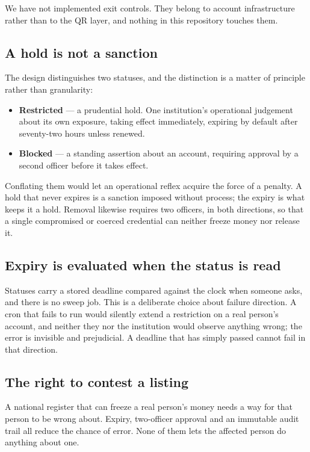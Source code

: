 \documentclass[10pt,a4paper,twocolumn]{article}
\begin{document}
We have not implemented exit controls. They belong to account infrastructure
rather than to the QR layer, and nothing in this repository touches them.

\subsection{A hold is not a sanction}

The design distinguishes two statuses, and the distinction is a matter of
principle rather than granularity:

\begin{itemize}[leftmargin=1.4em]
  \item \textbf{Restricted} --- a prudential hold. One institution's operational
    judgement about its own exposure, taking effect immediately, expiring by
    default after seventy-two hours unless renewed.
  \item \textbf{Blocked} --- a standing assertion about an account, requiring
    approval by a second officer before it takes effect.
\end{itemize}

Conflating them would let an operational reflex acquire the force of a penalty.
A hold that never expires is a sanction imposed without process; the expiry is
what keeps it a hold. Removal likewise requires two officers, in both
directions, so that a single compromised or coerced credential can neither
freeze money nor release it.

\subsection{Expiry is evaluated when the status is read}

Statuses carry a stored deadline compared against the clock when someone asks,
and there is no sweep job. This is a deliberate choice about failure direction.
A cron that fails to run would silently extend a restriction on a real person's
account, and neither they nor the institution would observe anything wrong; the
error is invisible and prejudicial. A deadline that has simply passed cannot
fail in that direction.

\subsection{The right to contest a listing}
\label{sec:appeal}

A national register that can freeze a real person's money needs a way for that
person to be wrong about. Expiry, two-officer approval and an immutable audit
trail all reduce the chance of error. None of them lets the affected person do
anything about one.
\end{document}

